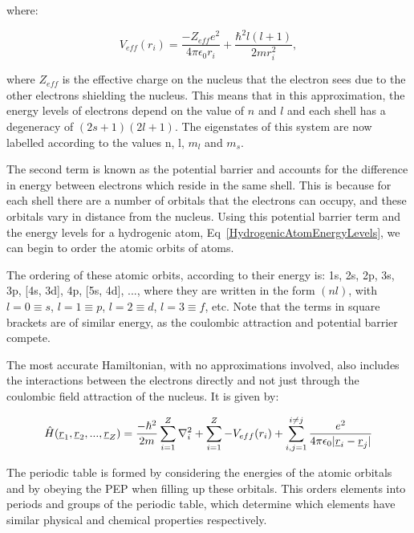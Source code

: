 \noindent where:

\begin{equation}
    V_{eff}(r_i) = \frac{-Z_{eff}e^2}{4 \pi \epsilon_0 r_i} + \frac{\hbar^2 l(l + 1)}{2mr^2_i},
    \label{ScreenedPotential}
\end{equation}

\noindent where $Z_{eff}$ is the effective charge on the nucleus that the electron sees due to the other electrons shielding the nucleus. This means that in this approximation, the energy levels of electrons depend on the value of $n$ and $l$ and each shell has a degeneracy of $(2s+1)(2l+1)$. The eigenstates of this system are now labelled according to the values n, l, $m_l$ and $m_s$. 

\noindent The second term is known as the potential barrier and accounts for the difference in energy between electrons which reside in the same shell. This is because for each shell there are a number of orbitals that the electrons can occupy, and these orbitals vary in distance from the nucleus. Using this potential barrier term and the energy levels for a hydrogenic atom, Eq~\ref{HydrogenicAtomEnergyLevels}, we can begin to order the atomic orbits of atoms. 

\noindent The ordering of these atomic orbits, according to their energy is: 1s, 2s, 2p, 3s, 3p, [4s, 3d], 4p, [5s, 4d], ..., where they are written in the form $(nl)$, with $l = 0 \equiv s$, $l = 1 \equiv p$, $l = 2 \equiv d$, $l = 3 \equiv f$, etc. Note that the terms in square brackets are of similar energy, as the coulombic attraction and potential barrier compete.

\noindent The most accurate Hamiltonian, with no approximations involved, also includes the interactions between the electrons directly and not just through the coulombic field attraction of the nucleus. It is given by:

\begin{equation}
    \Hat{H}(\underline{r}_1, \underline{r}_2, ..., \underline{r}_Z) = \frac{-\hbar^2}{2m} \sum^Z_{i=1} \nabla^2_i + \sum^Z_{i=1} -V_{eff}(r_i) + \sum_{i, j = 1}^{i \neq j} \frac{e^2}{4 \pi \epsilon_0 | \underline{r}_i - \underline{r}_j|} 
    \label{FullHamiltonian}
\end{equation}

\noindent The periodic table is formed by considering the energies of the atomic orbitals and by obeying the PEP when filling up these orbitals. This orders elements into periods and groups of the periodic table, which determine which elements have similar physical and chemical properties respectively. 

